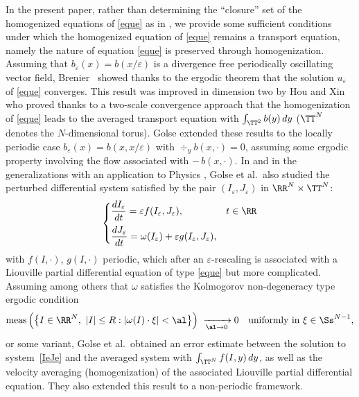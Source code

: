 In the present paper, rather than determining the ``closure'' set of the homogenized equations of \eqref{eque} as in \cite{AHZ1,AHZ2,AHZ3}, we provide some sufficient conditions under which the homogenized equation of \eqref{eque} remains a transport equation, namely the nature of equation \eqref{eque} is preserved through homogenization.
Assuming that $b_\varepsilon(x)=b(x/\varepsilon)$ is a divergence free periodically oscillating vector field, Brenier~\cite{Bre} showed thanks to the ergodic theorem that the solution $u_\varepsilon$ of \eqref{eque} converges. This result was improved in dimension two by Hou and Xin \cite{HoXi} who proved thanks to a two-scale convergence approach that the homogenization of \eqref{eque} leads to the averaged transport equation with $\int_{\TT^2}b(y)\,dy$ ($\TT^N$ denotes the $N$-dimensional torus). Golse \cite[Th.\,8]{Gol1} extended these results to the locally periodic case $b_\varepsilon(x)=b(x,x/\varepsilon)$ with $\div_yb(x,\cdot)=0$, assuming some ergodic property involving the flow associated with $-\,b(x,\cdot)$. In \cite{Gol1,Gol2} and in the generalizations \cite{DGL,DuGo} with an application to Physics \cite{DEG}, Golse et al.\ also studied the perturbed differential system satisfied by the pair $(I_\varepsilon,J_\varepsilon)$ in $\RR^N\times\TT^N$:
\begin{equation}\label{IeJe}
\begin{cases}
\dfrac{d I_\varepsilon}{dt}=\varepsilon f(I_\varepsilon,J_\varepsilon), & t\in\RR
\\[8pt]
\dfrac{d J_\varepsilon}{dt}=\omega(I_\varepsilon)+\varepsilon g(I_\varepsilon,J_\varepsilon),
\end{cases}
\end{equation}
with $f(I,\cdot)$, $g(I,\cdot)$ periodic, which after an $\varepsilon$-rescaling is associated with a Liouville partial differential equation of type \eqref{eque} but more complicated. Assuming among others that $\omega$ satisfies the Kolmogorov non-degeneracy type ergodic condition
\begin{equation}\label{ergK}
\mbox{meas}\left(\big\{I\in\RR^N,\ |I|\leq R:|\omega(I)\cdot\xi|<\al\big\}\right)\;\xrightarrow[\al\to 0]\; 0\quad\mbox{uniformly in }\xi\in\Ss^{N-1},
\end{equation}
or some variant, Golse et al.\ obtained an error estimate between the solution to system~\eqref{IeJe} and the averaged system with $\int_{\TT^N}f(I,y)\,dy$, as well as the velocity averaging (homogenization) of the associated Liouville partial differential equation. They also extended this result to a non-periodic framework.

